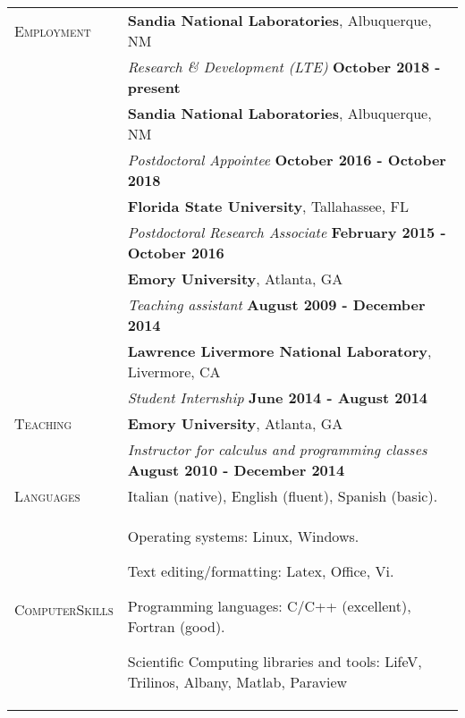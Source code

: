 \documentclass[10pt]{article}
\begin{document}
\begin{tabular}{p{2.5cm}|p{15.5cm}}
\\
\textsc{Employment} &

\textbf{Sandia National Laboratories}, Albuquerque, NM\\
& \textit{Research \& Development (LTE)} \hspace*{6.5cm} \textbf{October 2018 - present}

\\
&\textbf{Sandia National Laboratories}, Albuquerque, NM\\
& \textit{Postdoctoral Appointee} \hspace*{6.7cm} \textbf{October 2016 - October 2018}

\\
&\textbf{Florida State University}, Tallahassee, FL\\
& \textit{Postdoctoral Research Associate} \hspace*{5.1cm} \textbf{February 2015 - October 2016}

\\
&\textbf{Emory University}, Atlanta, GA\\
& \textit{Teaching assistant} \hspace*{7.2cm} \textbf{August 2009 - December 2014}

\\
&\textbf{Lawrence Livermore National Laboratory}, Livermore, CA\\
& \textit{Student Internship} \hspace*{8cm} \textbf{June 2014 - August 2014}

\\
\textsc{Teaching}
 & \textbf{Emory University}, Atlanta, GA\\
 & \textit{Instructor for calculus and programming classes} \hspace*{2.5cm} \textbf{August 2010 - December 2014}

\\
\textsc{Languages} & Italian (native), English (fluent), Spanish (basic).

\\
\textsc{Computer\linebreak Skills} &

Operating systems: Linux, Windows.

Text editing/formatting: Latex, Office, Vi.

Programming languages: C/C++ (excellent), Fortran (good).

Scientific Computing libraries and tools: LifeV, Trilinos, Albany, Matlab, Paraview


\end{tabular}
\end{document}
